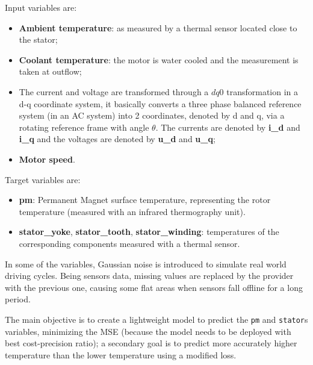 Input variables are:
\begin{itemize}[topsep=0ex, noitemsep]
    \item \textbf{Ambient temperature}: as measured by a thermal sensor located close to the stator;
    \item \textbf{Coolant temperature}: the motor is water cooled and the measurement is taken at outflow;
    \item The current and voltage are transformed through a $dq0$ transformation in a d-q coordinate system, it basically converts a three phase balanced reference system (in an AC system) into 2 coordinates, denoted by d and q, via a rotating reference frame with angle $\theta$.
    The currents are denoted by \textbf{i\_d} and \textbf{i\_q} and the voltages are denoted by \textbf{u\_d} and \textbf{u\_q};
    \item \textbf{Motor speed}.
\end{itemize}

Target variables are:
\begin{itemize}[topsep=0ex, noitemsep]
    \item \textbf{pm}: Permanent Magnet surface temperature, representing the rotor temperature (measured with an infrared thermography unit).
    \item \textbf{stator\_yoke}, \textbf{stator\_tooth}, \textbf{stator\_winding}: temperatures of the corresponding components measured with a thermal sensor.
\end{itemize}
In some of the variables, Gaussian noise is introduced to simulate real world driving cycles. Being sensors data, missing values are replaced by the provider with the previous one, causing some flat areas when sensors fall offline for a long period. 

The main objective is to create a lightweight model to predict the \verb|pm| and \verb|stator|s variables, minimizing the MSE (because the model needs to be deployed with best cost-precision ratio); a secondary goal is to predict more accurately higher temperature than the lower temperature using a modified loss.

